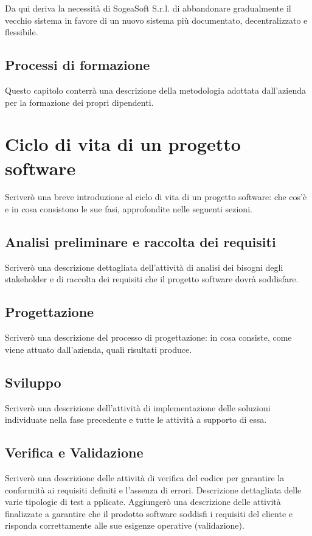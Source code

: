         \noindent Da qui deriva la necessità di SogeaSoft S.r.l. di abbandonare gradualmente il vecchio sistema in favore di un nuovo sistema più documentato, decentralizzato e flessibile. 
        
        \subsection{Processi di formazione}
        Questo capitolo conterrà una descrizione della metodologia adottata dall’azienda per la formazione dei propri dipendenti.
    \section{Ciclo di vita di un progetto software}
    Scriverò una breve introduzione al ciclo di vita di un progetto software: che cos’è e in cosa
    consistono le sue fasi, approfondite nelle seguenti sezioni.
        \subsection{Analisi preliminare e raccolta dei requisiti}
        Scriverò una descrizione dettagliata dell’attività di analisi dei bisogni degli stakeholder e di
        raccolta dei requisiti che il progetto software dovrà soddisfare.
        \subsection{Progettazione}
        Scriverò una descrizione del processo di progettazione: in cosa consiste, come viene attuato
        dall’azienda, quali risultati produce.
        \subsection{Sviluppo}
        Scriverò una descrizione dell’attività di implementazione delle soluzioni individuate nella
        fase precedente e tutte le attività a supporto di essa.
        \subsection{Verifica e Validazione}
        Scriverò una descrizione delle attività di verifica del codice per garantire la conformità ai
        requisiti definiti e l'assenza di errori. Descrizione dettagliata delle varie tipologie di test a       pplicate.
        Aggiungerò una descrizione delle attività finalizzate a garantire che il prodotto software
        soddisfi i requisiti del cliente e risponda correttamente alle sue      esigenze operative
        (validazione).
